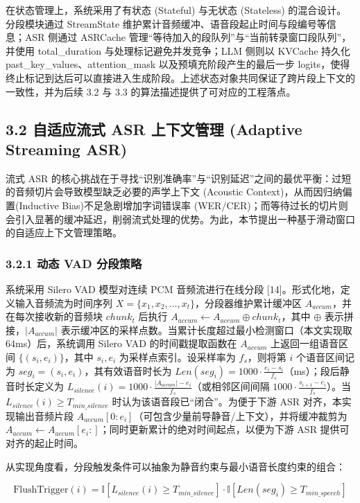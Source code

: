 \documentclass[UTF8,a4paper,12pt]{ctexart}
\begin{document}
在状态管理上，系统采用了有状态 (Stateful) 与无状态 (Stateless) 的混合设计。分段模块通过 StreamState 维护累计音频缓冲、语音段起止时间与段编号等信息；ASR 侧通过 ASRCache 管理“等待加入的段队列”与“当前转录窗口段队列”，并使用 total\_duration 与处理标记避免并发竞争；LLM 侧则以 KVCache 持久化 past\_key\_values、attention\_mask 以及预填充阶段产生的最后一步 logits，使得终止标记到达后可以直接进入生成阶段。上述状态对象共同保证了跨片段上下文的一致性，并为后续 3.2 与 3.3 的算法描述提供了可对应的工程落点。

\subsection*{3.2 自适应流式 ASR 上下文管理 (Adaptive Streaming ASR)}


流式 ASR 的核心挑战在于寻找“识别准确率”与“识别延迟”之间的最优平衡：过短的音频切片会导致模型缺乏必要的声学上下文 (Acoustic Context)，从而因归纳偏置(Inductive Bias)不足急剧增加字词错误率 (WER/CER)；而等待过长的切片则会引入显著的缓冲延迟，削弱流式处理的优势。为此，本节提出一种基于滑动窗口的自适应上下文管理策略。  

\subsubsection*{3.2.1 动态 VAD 分段策略}


系统采用 Silero VAD 模型对连续 PCM 音频流进行在线分段 [14]。形式化地，定义输入音频流为时间序列 $X=\{x_1,x_2,\dots,x_t\}$，分段器维护累计缓冲区 $A_{accum}$，并在每次接收新的音频块 $chunk_t$ 后执行 $A_{accum}\leftarrow A_{accum}\oplus chunk_t$，其中 $\oplus$ 表示拼接，$|A_{accum}|$ 表示缓冲区的采样点数。当累计长度超过最小检测窗口（本文实现取 64ms）后，系统调用 Silero VAD 的时间戳提取函数在 $A_{accum}$ 上返回一组语音区间 $\{(s_i,e_i)\}$，其中 $s_i,e_i$ 为采样点索引。设采样率为 $f_s$，则将第 $i$ 个语音区间记为 $seg_i=(s_i,e_i)$，其有效语音时长为 $Len(seg_i)=1000\cdot\frac{e_i-s_i}{f_s}$（ms）；段后静音时长定义为 $L_{silence}(i)=1000\cdot\frac{|A_{accum}|-e_i}{f_s}$（或相邻区间间隔 $1000\cdot\frac{s_{i+1}-e_i}{f_s}$）。当 $L_{silence}(i)\ge T_{min\_silence}$ 时认为该语音段已“闭合”。为便于下游 ASR 对齐，本实现输出音频片段 $A_{accum}[0:e_i]$（可包含少量前导静音/上下文），并将缓冲裁剪为 $A_{accum}\leftarrow A_{accum}[e_i:]$；同时更新累计的绝对时间起点，以便为下游 ASR 提供可对齐的起止时间。

从实现角度看，分段触发条件可以抽象为静音约束与最小语音长度约束的组合：

\[
\text{FlushTrigger}(i)=\mathbb{I}\left[L_{silence}(i)\ge T_{min\_silence}\right]\cdot \mathbb{I}\left[Len(seg_i)\ge T_{min\_speech}\right]
\]
\end{document}
